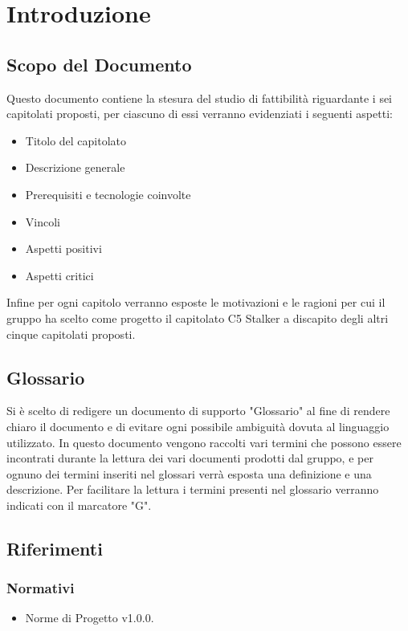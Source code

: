 \section{Introduzione}
\subsection{Scopo del Documento}
Questo documento contiene la stesura del studio di fattibilità riguardante i sei capitolati proposti, per ciascuno di essi verranno evidenziati i seguenti aspetti:
\begin{itemize}
\item Titolo del capitolato
\item Descrizione generale
\item Prerequisiti e tecnologie coinvolte
\item Vincoli
\item Aspetti positivi
\item Aspetti critici
\end{itemize}
Infine per ogni capitolo verranno esposte le motivazioni e le ragioni per cui il gruppo ha scelto come progetto il capitolato C5 Stalker a discapito degli altri cinque capitolati proposti.

\subsection{Glossario}
Si è scelto di redigere un documento di supporto "Glossario" al fine di rendere chiaro il documento e di evitare ogni possibile ambiguità dovuta al linguaggio utilizzato. In questo documento vengono raccolti vari termini che possono essere incontrati durante la lettura dei vari documenti prodotti dal gruppo, e per ognuno dei termini inseriti nel glossari  verrà esposta una definizione e una descrizione. Per facilitare la lettura i termini presenti nel glossario verranno indicati con il marcatore "G".
	
\subsection{Riferimenti}

\subsubsection{Normativi}
\begin{itemize}
\item Norme di Progetto v1.0.0.
\end{itemize}

